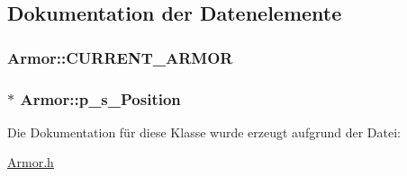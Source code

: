\subsection{Dokumentation der Datenelemente}
\hypertarget{class_armor_a41b1d44de440d9bbbcd4c4b8f7757f53}{
\subsubsection[{C\-U\-R\-R\-E\-N\-T\-\_\-\-A\-R\-M\-O\-R}]{ Armor\-::\-C\-U\-R\-R\-E\-N\-T\-\_\-\-A\-R\-M\-O\-R\hspace{0.3cm}{\ttfamily [private]}}}\label{class_armor_a41b1d44de440d9bbbcd4c4b8f7757f53}
\hypertarget{class_armor_a176b9bdfec3dcc70738547f7b8659912}{
\subsubsection[{p\-\_\-s\-\_\-\-Position}]{$\ast$ Armor\-::p\-\_\-s\-\_\-\-Position\hspace{0.3cm}{\ttfamily [private]}}}\label{class_armor_a176b9bdfec3dcc70738547f7b8659912}


Die Dokumentation für diese Klasse wurde erzeugt aufgrund der Datei\-:\begin{DoxyCompactItemize}
\item 
\hyperlink{_armor_8h}{Armor.\-h}\end{DoxyCompactItemize}
